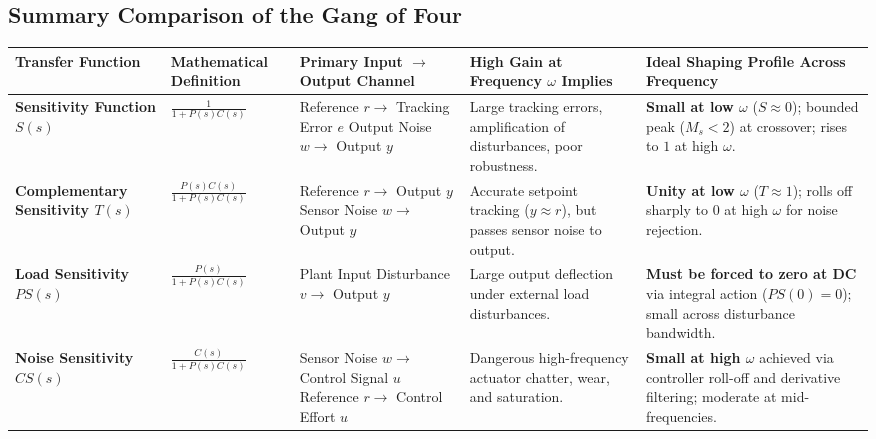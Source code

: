 \documentclass[12pt,onecolumn,twoside ]{article}
\begin{document}
	\subsection{Summary Comparison of the Gang of Four}
	\begin{center}\small\begin{tabularx}{\textwidth}{*{5}{Y}}
			\toprule
			\textbf{Transfer Function} & \textbf{Mathematical Definition} & \textbf{Primary Input $\to$ Output Channel} & \textbf{High Gain at Frequency $\omega$ Implies} & \textbf{Ideal Shaping Profile Across Frequency} \\
			\midrule
			\textbf{Sensitivity Function $S(s)$} & $\frac{1}{1 + P(s)C(s)}$ & Reference $r \to$ Tracking Error $e$ Output Noise $w \to$ Output $y$ & Large tracking errors, amplification of disturbances, poor robustness. & \textbf{Small at low $\omega$} ($S \approx 0$); bounded peak ($M_s < 2$) at crossover; rises to $1$ at high $\omega$. \\
			\textbf{Complementary Sensitivity $T(s)$} & $\frac{P(s)C(s)}{1 + P(s)C(s)}$ & Reference $r \to$ Output $y$ Sensor Noise $w \to$ Output $y$ & Accurate setpoint tracking ($y \approx r$), but passes sensor noise to output. & \textbf{Unity at low $\omega$} ($T \approx 1$); rolls off sharply to $0$ at high $\omega$ for noise rejection. \\
			\textbf{Load Sensitivity $PS(s)$} & $\frac{P(s)}{1 + P(s)C(s)}$ & Plant Input Disturbance $v \to$ Output $y$ & Large output deflection under external load disturbances. & \textbf{Must be forced to zero at DC} via integral action ($PS(0) = 0$); small across disturbance bandwidth. \\
			\textbf{Noise Sensitivity $CS(s)$} & $\frac{C(s)}{1 + P(s)C(s)}$ & Sensor Noise $w \to$ Control Signal $u$ Reference $r \to$ Control Effort $u$ & Dangerous high-frequency actuator chatter, wear, and saturation. & \textbf{Small at high $\omega$} achieved via controller roll-off and derivative filtering; moderate at mid-frequencies. \\
			\bottomrule
	\end{tabularx}\end{center}
	
\end{document}
